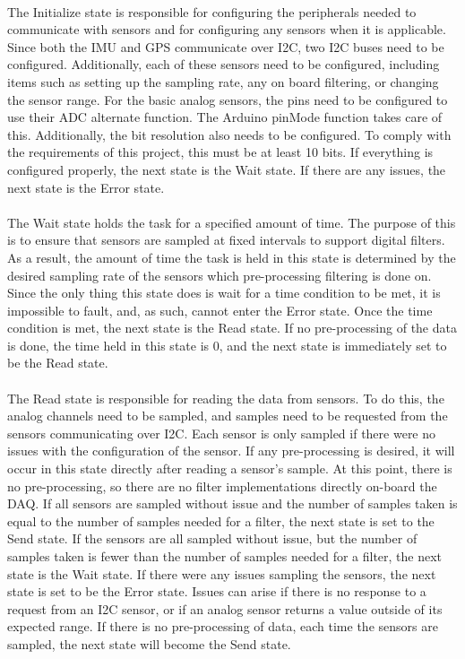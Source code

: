 \paragraph{}
The Initialize state is responsible for configuring the peripherals needed to communicate with sensors and for configuring any sensors when it is applicable.
Since both the IMU and GPS communicate over I2C, two I2C buses need to be configured.
Additionally, each of these sensors need to be configured, including items such as setting up the sampling rate, any on board filtering, or changing the sensor range.
For the basic analog sensors, the pins need to be configured to use their ADC alternate function.
The Arduino pinMode function takes care of this.
Additionally, the bit resolution also needs to be configured.
To comply with the requirements of this project, this must be at least 10 bits.
If everything is configured properly, the next state is the Wait state.
If there are any issues, the next state is the Error state.

\paragraph{}
The Wait state holds the task for a specified amount of time.
The purpose of this is to ensure that sensors are sampled at fixed intervals to support digital filters.
As a result, the amount of time the task is held in this state is determined by the desired sampling rate of the sensors which pre-processing filtering is done on.
Since the only thing this state does is wait for a time condition to be met, it is impossible to fault, and, as such, cannot enter the Error state.
Once the time condition is met, the next state is the Read state.
If no pre-processing of the data is done, the time held in this state is 0, and the next state is immediately set to be the Read state.

\paragraph{}
The Read state is responsible for reading the data from sensors.
To do this, the analog channels need to be sampled, and samples need to be requested from the sensors communicating over I2C.
Each sensor is only sampled if there were no issues with the configuration of the sensor.
If any pre-processing is desired, it will occur in this state directly after reading a sensor's sample.
At this point, there is no pre-processing, so there are no filter implementations directly on-board the DAQ.
If all sensors are sampled without issue and the number of samples taken is equal to the number of samples needed for a filter, the next state is set to the Send state.
If the sensors are all sampled without issue, but the number of samples taken is fewer than the number of samples needed for a filter, the next state is the Wait state.
If there were any issues sampling the sensors, the next state is set to be the Error state.
Issues can arise if there is no response to a request from an I2C sensor, or if an analog sensor returns a value outside of its expected range.
If there is no pre-processing of data, each time the sensors are sampled, the next state will become the Send state.

